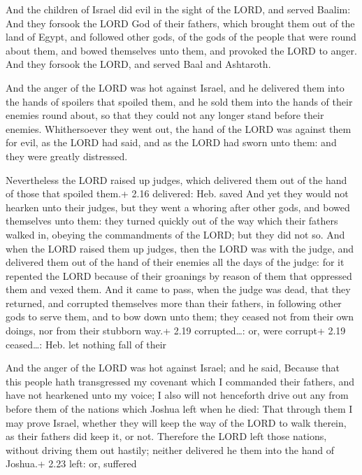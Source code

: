  And the children of Israel did evil in the sight of the
LORD, and served Baalim:  And they forsook the LORD God of
their fathers, which brought them out of the land of Egypt, and followed
other gods, of the gods of the people that were round about them, and
bowed themselves unto them, and provoked the LORD to anger.
 And they forsook the LORD, and served Baal and Ashtaroth.

 And the anger of the LORD was hot against Israel, and he
delivered them into the hands of spoilers that spoiled them, and he sold
them into the hands of their enemies round about, so that they could not
any longer stand before their enemies.  Whithersoever they
went out, the hand of the LORD was against them for evil, as the LORD
had said, and as the LORD had sworn unto them: and they were greatly
distressed.

 Nevertheless the LORD raised up judges, which delivered
them out of the hand of those that spoiled them.+ 2.16 delivered: Heb.
saved  And yet they would not hearken unto their judges,
but they went a whoring after other gods, and bowed themselves unto
them: they turned quickly out of the way which their fathers walked in,
obeying the commandments of the LORD; but they did not so. 
And when the LORD raised them up judges, then the LORD was with the
judge, and delivered them out of the hand of their enemies all the days
of the judge: for it repented the LORD because of their groanings by
reason of them that oppressed them and vexed them.  And it
came to pass, when the judge was dead, that they returned, and corrupted
themselves more than their fathers, in following other gods to serve
them, and to bow down unto them; they ceased not from their own doings,
nor from their stubborn way.+ 2.19 corrupted\ldots: or, were corrupt+
2.19 ceased\ldots: Heb. let nothing fall of their

 And the anger of the LORD was hot against Israel; and he
said, Because that this people hath transgressed my covenant which I
commanded their fathers, and have not hearkened unto my voice;
 I also will not henceforth drive out any from before them
of the nations which Joshua left when he died:  That
through them I may prove Israel, whether they will keep the way of the
LORD to walk therein, as their fathers did keep it, or not.
 Therefore the LORD left those nations, without driving
them out hastily; neither delivered he them into the hand of Joshua.+
2.23 left: or, suffered

